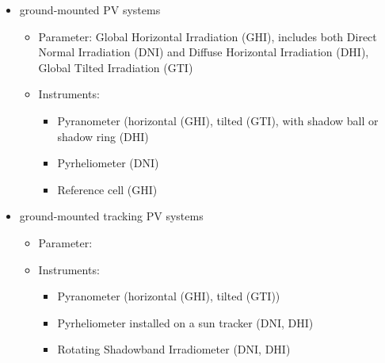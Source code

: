 \begin{itemize}
    \item ground-mounted PV systems 
\begin{itemize}
    \item Parameter: Global Horizontal Irradiation (GHI), includes both Direct Normal Irradiation (DNI) and Diffuse Horizontal Irradiation (DHI),  Global Tilted Irradiation (GTI)
    \item Instruments: 
        \begin{itemize}
            \item Pyranometer (horizontal (GHI), tilted (GTI), with shadow ball or shadow ring (DHI)
            \item Pyrheliometer (DNI)
            \item  Reference cell (GHI)
        \end{itemize}

\end{itemize}
    \item ground-mounted tracking PV systems 
        \begin{itemize}
            \item Parameter: 
            \item Instruments: 
            \begin{itemize}
                \item Pyranometer (horizontal (GHI), tilted (GTI))
                \item Pyrheliometer installed on a sun tracker (DNI, DHI)
                \item Rotating Shadowband Irradiometer (DNI, DHI)
            \end{itemize}
        \end{itemize}


\end{itemize}
